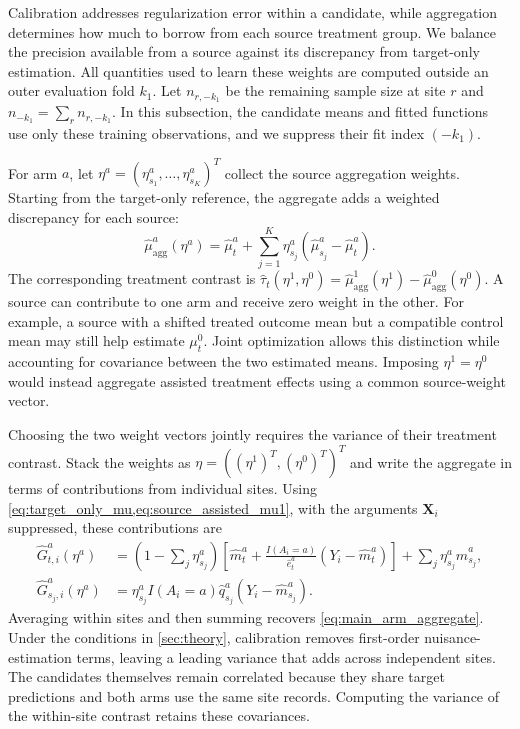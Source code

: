 \documentclass[12pt]{article}
\begin{document}
Calibration addresses regularization error within a candidate, while aggregation determines how much to borrow from each source treatment group. We balance the precision available from a source against its discrepancy from target-only estimation. All quantities used to learn these weights are computed outside an outer evaluation fold $k_1$. Let $n_{r,-k_1}$ be the remaining sample size at site $r$ and $n_{-k_1}=\sum_r n_{r,-k_1}$. In this subsection, the candidate means and fitted functions use only these training observations, and we suppress their fit index $(-k_1)$.

For arm $a$, let $\eta^a=(\eta_{s_1}^a,\ldots,\eta_{s_K}^a)^T$ collect the source aggregation weights. Starting from the target-only reference, the aggregate adds a weighted discrepancy for each source:
\begin{equation}\label{eq:main_arm_aggregate}
\widehat\mu_{\mathrm{agg}}^a(\eta^a)
=\widehat\mu_t^a+\sum_{j=1}^K\eta_{s_j}^a
 (\widehat\mu_{s_j}^a-\widehat\mu_t^a).
\end{equation}
The corresponding treatment contrast is $\widehat\tau_t(\eta^1,\eta^0)=\widehat\mu_{\mathrm{agg}}^1(\eta^1)-\widehat\mu_{\mathrm{agg}}^0(\eta^0)$. A source can contribute to one arm and receive zero weight in the other. For example, a source with a shifted treated outcome mean but a compatible control mean may still help estimate $\mu_t^0$. Joint optimization allows this distinction while accounting for covariance between the two estimated means. Imposing $\eta^1=\eta^0$ would instead aggregate assisted treatment effects using a common source-weight vector.

Choosing the two weight vectors jointly requires the variance of their treatment contrast. Stack the weights as $\eta=((\eta^1)^T,(\eta^0)^T)^T$ and write the aggregate in terms of contributions from individual sites. Using \cref{eq:target_only_mu,eq:source_assisted_mu1}, with the arguments $\boldsymbol X_i$ suppressed, these contributions are
\begin{equation}\label{eq:main_site_contributions}
\begin{aligned}
\widehat G_{t,i}^a(\eta^a)&=\left(1-\sum_j\eta_{s_j}^a\right)
\left[\widehat m_t^a+\frac{I(A_i=a)}{\widehat e_t^a}(Y_i-\widehat m_t^a)\right]
+\sum_j\eta_{s_j}^a\widehat m_{s_j}^a,\\
\widehat G_{s_j,i}^a(\eta^a)&=\eta_{s_j}^a I(A_i=a)\widehat q_{s_j}^a
(Y_i-\widehat m_{s_j}^a).
\end{aligned}
\end{equation}
Averaging within sites and then summing recovers \cref{eq:main_arm_aggregate}. Under the conditions in \cref{sec:theory}, calibration removes first-order nuisance-estimation terms, leaving a leading variance that adds across independent sites. The candidates themselves remain correlated because they share target predictions and both arms use the same site records. Computing the variance of the within-site contrast retains these covariances.
\end{document}
